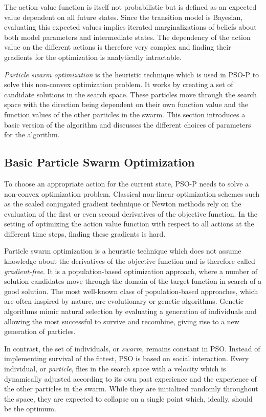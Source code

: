 The action value function is itself not probabilistic but is defined as an expected value dependent on all future states.
Since the transition model is Bayesian, evaluating this expected values implies iterated marginalizations of beliefs about both model parameters and intermediate states.
The dependency of the action value on the different actions is therefore very complex and finding their gradients for the optimization is analytically intractable.

\emph{Particle swarm optimization} is the heuristic technique which is used in {PSO-P} to solve this non-convex optimization problem.
It works by creating a set of candidate solutions in the search space.
These particles move through the search space with the direction being dependent on their own function value and the function values of the other particles in the swarm.
This section introduces a basic version of the algorithm and discusses the different choices of parameters for the algorithm.

\subsection{Basic Particle Swarm Optimization}
To choose an appropriate action for the current state, PSO-P needs to solve a non-convex optimization problem.
Classical non-linear optimization schemes such as the scaled conjugated gradient technique or Newton methods \cite{press_numerical_2007} rely on the evaluation of the first or even second derivatives of the objective function.
In the setting of optimizing the action value function with respect to all actions at the different time steps, finding these gradients is hard.

Particle swarm optimization is a heuristic technique which does not assume knowledge about the derivatives of the objective function and is therefore called \emph{gradient-free}.
It is a population-based optimization approach, where a number of solution candidates move through the domain of the target function in search of a good solution.
The most well-known class of population-based approaches, which are often inspired by nature, are evolutionary or genetic algorithms.
Genetic algorithms mimic natural selection by evaluating a generation of individuals and allowing the most successful to survive and recombine, giving rise to a new generation of particles.

In contrast, the set of individuals, or \emph{swarm}, remains constant in PSO.
Instead of implementing survival of the fittest, PSO is based on social interaction.
Every individual, or \emph{particle}, flies in the search space with a velocity which is dynamically adjusted according to its own past experience and the experience of the other particles in the swarm.
While they are initialized randomly throughout the space, they are expected to collapse on a single point which, ideally, should be the optimum.

